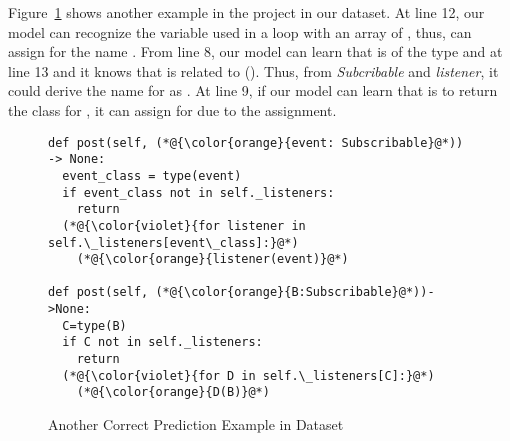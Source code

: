 Figure~\ref{example2} shows another example in the project
 in our dataset. At line 12, our model can recognize
the variable  used in a  loop with an array of
, thus, can assign for  the name
. From line 8, our model can learn that  is of
the type  and at line 13 and it knows that 
is related to  (). Thus, from {\em Subcribable}
and \emph{listener}, it could derive the name for  as
. At line 9, if our model can learn that  is to
return the class for , it can assign 
 for  due to the assignment.

\begin{figure}[t]
	\centering {} \begin{lstlisting}[]
def post(self, (*@{\color{orange}{event: Subscribable}@*)) -> None:
  event_class = type(event)
  if event_class not in self._listeners:
    return
  (*@{\color{violet}{for listener in self.\_listeners[event\_class]:}@*)
    (*@{\color{orange}{listener(event)}@*)

def post(self, (*@{\color{orange}{B:Subscribable}@*))->None:
  C=type(B)
  if C not in self._listeners:
    return
  (*@{\color{violet}{for D in self.\_listeners[C]:}@*)
    (*@{\color{orange}{D(B)}@*)
\end{lstlisting}
\vspace{-16pt}
\caption{Another Correct Prediction Example in Dataset}
\label{example2}
\end{figure}

